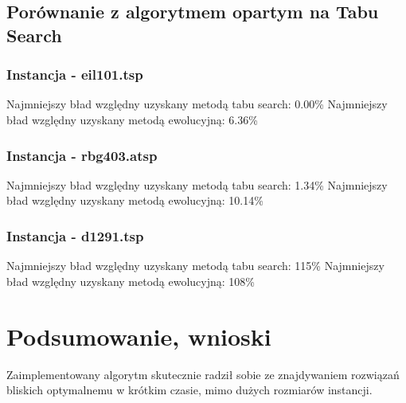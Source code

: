 \documentclass[a4paper,11pt]{article}
\begin{document}
\newpage

\subsection{Porównanie z algorytmem opartym na Tabu Search}

\subsubsection{Instancja - eil101.tsp}

Najmniejszy bład względny uzyskany metodą tabu search: 0.00\%\newline
Najmniejszy bład względny uzyskany metodą ewolucyjną: 6.36\%

\subsubsection{Instancja - rbg403.atsp}

Najmniejszy bład względny uzyskany metodą tabu search: 1.34\%\newline
Najmniejszy bład względny uzyskany metodą ewolucyjną: 10.14\%

\subsubsection{Instancja - d1291.tsp}


Najmniejszy bład względny uzyskany metodą tabu search: 115\%\newline
Najmniejszy bład względny uzyskany metodą ewolucyjną: 108\%

\section{Podsumowanie, wnioski}

Zaimplementowany algorytm skutecznie radził sobie ze znajdywaniem rozwiązań bliskich optymalnemu w krótkim czasie, mimo dużych rozmiarów instancji. 
\end{document}
